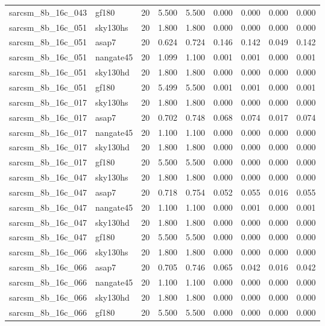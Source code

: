 \begin{tabular}{llrrrrrrr}
sarcsm\_8b\_16c\_043 & gf180 & 20 & 5.500 & 5.500 & 0.000 & 0.000 & 0.000 & 0.000 \\
sarcsm\_8b\_16c\_051 & sky130hs & 20 & 1.800 & 1.800 & 0.000 & 0.000 & 0.000 & 0.000 \\
sarcsm\_8b\_16c\_051 & asap7 & 20 & 0.624 & 0.724 & 0.146 & 0.142 & 0.049 & 0.142 \\
sarcsm\_8b\_16c\_051 & nangate45 & 20 & 1.099 & 1.100 & 0.001 & 0.001 & 0.000 & 0.001 \\
sarcsm\_8b\_16c\_051 & sky130hd & 20 & 1.800 & 1.800 & 0.000 & 0.000 & 0.000 & 0.000 \\
sarcsm\_8b\_16c\_051 & gf180 & 20 & 5.499 & 5.500 & 0.001 & 0.001 & 0.000 & 0.001 \\
sarcsm\_8b\_16c\_017 & sky130hs & 20 & 1.800 & 1.800 & 0.000 & 0.000 & 0.000 & 0.000 \\
sarcsm\_8b\_16c\_017 & asap7 & 20 & 0.702 & 0.748 & 0.068 & 0.074 & 0.017 & 0.074 \\
sarcsm\_8b\_16c\_017 & nangate45 & 20 & 1.100 & 1.100 & 0.000 & 0.000 & 0.000 & 0.000 \\
sarcsm\_8b\_16c\_017 & sky130hd & 20 & 1.800 & 1.800 & 0.000 & 0.000 & 0.000 & 0.000 \\
sarcsm\_8b\_16c\_017 & gf180 & 20 & 5.500 & 5.500 & 0.000 & 0.000 & 0.000 & 0.000 \\
sarcsm\_8b\_16c\_047 & sky130hs & 20 & 1.800 & 1.800 & 0.000 & 0.000 & 0.000 & 0.000 \\
sarcsm\_8b\_16c\_047 & asap7 & 20 & 0.718 & 0.754 & 0.052 & 0.055 & 0.016 & 0.055 \\
sarcsm\_8b\_16c\_047 & nangate45 & 20 & 1.100 & 1.100 & 0.000 & 0.001 & 0.000 & 0.001 \\
sarcsm\_8b\_16c\_047 & sky130hd & 20 & 1.800 & 1.800 & 0.000 & 0.000 & 0.000 & 0.000 \\
sarcsm\_8b\_16c\_047 & gf180 & 20 & 5.500 & 5.500 & 0.000 & 0.000 & 0.000 & 0.000 \\
sarcsm\_8b\_16c\_066 & sky130hs & 20 & 1.800 & 1.800 & 0.000 & 0.000 & 0.000 & 0.000 \\
sarcsm\_8b\_16c\_066 & asap7 & 20 & 0.705 & 0.746 & 0.065 & 0.042 & 0.016 & 0.042 \\
sarcsm\_8b\_16c\_066 & nangate45 & 20 & 1.100 & 1.100 & 0.000 & 0.000 & 0.000 & 0.000 \\
sarcsm\_8b\_16c\_066 & sky130hd & 20 & 1.800 & 1.800 & 0.000 & 0.000 & 0.000 & 0.000 \\
sarcsm\_8b\_16c\_066 & gf180 & 20 & 5.500 & 5.500 & 0.000 & 0.000 & 0.000 & 0.000 \\

\end{tabular}
